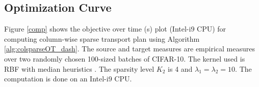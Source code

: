 \begin{figure}[ht!]
 \end{figure}

\subsection{Optimization Curve}

Figure \ref{comp} shows the objective over time (s) plot (Intel-i9 CPU) for computing column-wise sparse transport plan using Algorithm \ref{alg:colsparseOT_dash}. The source and target measures are empirical measures over two randomly chosen 100-sized batches of CIFAR-10. The kernel used is RBF with median heuristics \citep{gretton12a}. The sparsity level $K_2$ is 4 and $\lambda_1=\lambda_2=10$. The computation is done on an Intel-i9 CPU.

